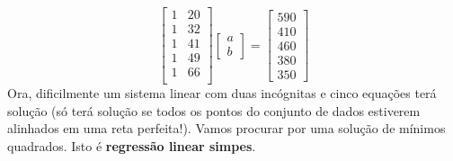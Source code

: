\documentclass[../livro.tex]{subfiles}  %
\begin{document}
\begin{example}
\begin{equation}
\begin{bmatrix}
    1 & 20 \\
    1 & 32 \\
    1 & 41 \\
    1 & 49 \\
    1 & 66 \\
  \end{bmatrix}
  \begin{bmatrix}
    a \\ b
  \end{bmatrix} =
  \begin{bmatrix}
    590 \\ 410 \\ 460 \\ 380 \\ 350
  \end{bmatrix}
  \end{equation} Ora, dificilmente um sistema linear com duas incógnitas e cinco equações terá solução (só terá solução se todos os pontos do conjunto de dados estiverem alinhados em uma reta perfeita!). Vamos procurar por uma solução de mínimos quadrados. Isto é \textbf{regressão linear simpes}.


\end{example}
\end{document}
